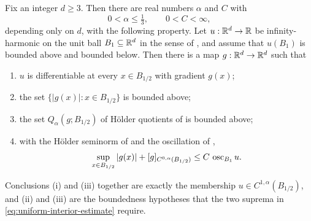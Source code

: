 \begin{theorem}
Fix an integer $d\ge3$. Then there are real numbers $\alpha$ and $C$ with
\[
  0<\alpha\le\tfrac13,\qquad 0<C<\infty,
\]
depending only on $d$, with the following property. Let $u:\mathbb{R}^d\to\mathbb{R}$ be
infinity-harmonic on the unit ball $B_1\subseteq\mathbb{R}^d$ in the sense of
, and assume that $u(B_1)$ is bounded above and bounded
below. Then there is a map $g:\mathbb{R}^d\to\mathbb{R}^d$ such that
\begin{enumerate}
\item[(i)] $u$ is differentiable at every $x\in B_{1/2}$ with gradient $g(x)$;
\item[(ii)] the set $\{|g(x)|:x\in B_{1/2}\}$ is bounded above;
\item[(iii)] the set $Q_\alpha(g;B_{1/2})$ of H\"older quotients of
 is bounded above;
\item[(iv)] with the H\"older seminorm of  and the
oscillation of ,
\begin{equation}\label{eq:uniform-interior-estimate}
  \sup_{x\in B_{1/2}}|g(x)|
   +[g]_{C^{0,\alpha}(B_{1/2})}
   \le C\,\operatorname{osc}_{B_1}u .
\end{equation}
\end{enumerate}
Conclusions (i) and (iii) together are exactly the membership
$u\in C^{1,\alpha}(B_{1/2})$, and (ii) and (iii) are the boundedness hypotheses
that the two suprema in \eqref{eq:uniform-interior-estimate} require.
\end{theorem}
